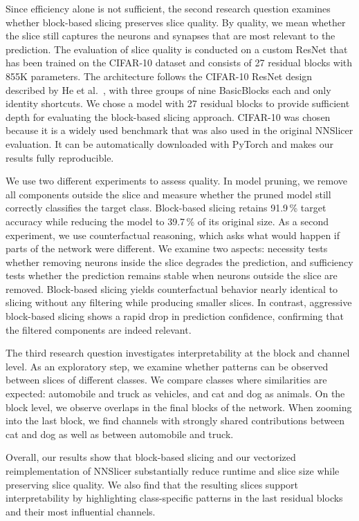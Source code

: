 \documentclass[
12pt,
fancyheadings,
a4paper,
twoside,
BCOR=0.7cm,
nobcorignoretitle,
grayscalebody,
]{stsreprt}
\begin{document}
Since efficiency alone is not sufficient, the second research question examines whether block-based
slicing preserves slice quality.
By quality, we mean whether the slice still captures the neurons and synapses that are most
relevant to the prediction.
The evaluation of slice quality is conducted on a custom ResNet that has been trained on the
CIFAR-10 dataset and consists of 27 residual blocks with 855K parameters.
The architecture follows the CIFAR-10 ResNet design described by He et al.~\cite{he2016deep}, with
three groups of nine BasicBlocks each and only identity shortcuts.
We chose a model with 27 residual blocks to provide sufficient depth for evaluating the block-based
slicing approach.
CIFAR-10 was chosen because it is a widely used benchmark that was also used in the original
NNSlicer evaluation.
It can be automatically downloaded with PyTorch and makes our results fully reproducible.

We use two different experiments to assess quality.
In model pruning, we remove all components outside the slice and measure whether the pruned model
still correctly classifies the target class.
Block-based slicing retains 91.9\,\% target accuracy while reducing the model to 39.7\,\% of its
original size.
As a second experiment, we use counterfactual reasoning, which asks what would happen if parts of
the network were different.
We examine two aspects: necessity tests whether removing neurons inside the slice degrades the
prediction, and sufficiency tests whether the prediction remains stable when neurons outside the
slice are removed.
Block-based slicing yields counterfactual behavior nearly identical to slicing without any
filtering while producing smaller slices. In contrast, aggressive block-based slicing shows a rapid
drop in prediction confidence, confirming that the filtered components are indeed relevant.

The third research question investigates interpretability at the block and channel level.
As an exploratory step, we examine whether patterns can be observed between slices of different
classes.
We compare classes where similarities are expected: automobile and truck as vehicles, and cat and
dog as animals.
On the block level, we observe overlaps in the final blocks of the network.
When zooming into the last block, we find channels with strongly shared contributions between cat
and dog as well as between automobile and truck.

Overall, our results show that block-based slicing and our vectorized reimplementation of NNSlicer
substantially reduce runtime and slice size while preserving slice quality.
We also find that the resulting slices support interpretability by highlighting class-specific
patterns in the last residual blocks and their most influential channels.
\end{document}
